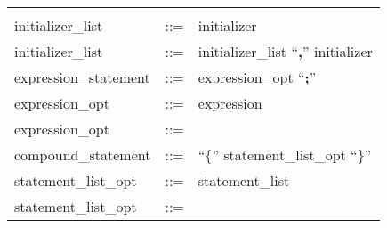 \documentclass[11pt]{article}
\begin{document}
\begin{longtable}{lrl}
\begin{minipage}[t]{\rulerhs}
  \end{minipage}                                                             \\
initializer\_list                          & ::= &
  \begin{minipage}[t]{\rulerhs}
    \raggedright
    initializer
  \end{minipage}                                                             \\
initializer\_list                          & ::= &
  \begin{minipage}[t]{\rulerhs}
    \raggedright
    initializer\_list ``{\bf ,}'' initializer
  \end{minipage}                                                             \\
expression\_statement                      & ::= &
  \begin{minipage}[t]{\rulerhs}
    \raggedright
    expression\_opt ``{\bf ;}''
  \end{minipage}                                                             \\
expression\_opt                            & ::= &
  \begin{minipage}[t]{\rulerhs}
    \raggedright
    expression
  \end{minipage}                                                             \\
expression\_opt                            & ::= &
  \begin{minipage}[t]{\rulerhs}
    \raggedright
    
  \end{minipage}                                                             \\
compound\_statement                        & ::= &
  \begin{minipage}[t]{\rulerhs}
    \raggedright
    ``{\bf $\{$}'' statement\_list\_opt ``{\bf $\}$}''
  \end{minipage}                                                             \\
statement\_list\_opt                       & ::= &
  \begin{minipage}[t]{\rulerhs}
    \raggedright
    statement\_list
  \end{minipage}                                                             \\
statement\_list\_opt                       & ::= &
  \begin{minipage}[t]{\rulerhs}
    \raggedright
    

\end{minipage}
\end{longtable}
\end{document}

